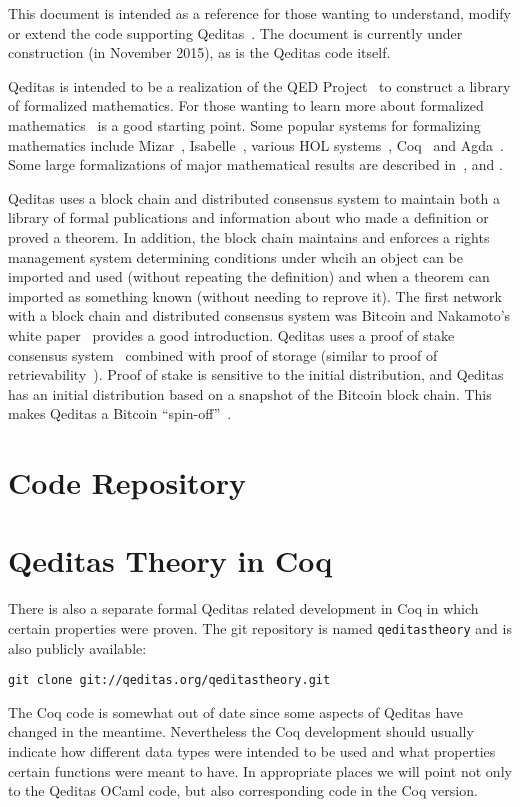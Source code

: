This document is intended as a reference
for those wanting to understand, modify or extend the
code supporting Qeditas~\cite{White2015c}.
The document is currently under construction (in November 2015),
as is the Qeditas code itself.

Qeditas is intended to be a realization of the QED Project~\cite{QED}
to construct a library of formalized mathematics.
For those wanting to learn more about formalized
mathematics~\cite{Barendregt2005} is a good starting point.
Some popular systems for formalizing mathematics include
Mizar~\cite{RudnickiTrybulec2001},
Isabelle~\cite{Nipkow-Paulson-Wenzel:2002},
various HOL systems~\cite{Gordon91,harrison-hollight},
Coq~\cite{Coq:manual} and
Agda~\cite{Norell08}.
Some large formalizations of major mathematical results
are described in~\cite{Gonthier2007}, \cite{Gonthier2013}
and
\cite{Flyspeck2015}.

Qeditas uses a block chain and distributed consensus system to maintain both a library
of formal publications
and information about who made a definition or proved a theorem.
In addition, the block chain maintains and enforces a rights management
system determining conditions under whcih an object can be imported and used
(without repeating the definition)
and when a theorem can imported as something known (without needing to reprove it).
The first network with a block chain and distributed consensus system
was Bitcoin and Nakamoto's white paper~\cite{Nakamoto2008} provides a good introduction.
Qeditas uses a proof of stake consensus system~\cite{ProofOfStakeDefinite}
combined with proof of storage (similar to proof of retrievability~\cite{MillerJSPK14}).
Proof of stake is sensitive to the initial distribution, and Qeditas
has an initial distribution based on a snapshot of the Bitcoin block chain.
This makes Qeditas a Bitcoin ``spin-off''~\cite{Spinoff,PreSpinoff}.

\section{Code Repository}



\section{Qeditas Theory in Coq}

There is also a separate formal Qeditas related development in Coq
in which certain properties were proven.
The git repository is named {\tt{qeditastheory}}
and is also publicly available:
\begin{verbatim}
git clone git://qeditas.org/qeditastheory.git
\end{verbatim}
The Coq code is somewhat out of date since some aspects of Qeditas have changed
in the meantime. Nevertheless the Coq development should usually indicate how
different data types were intended to be used and what properties certain functions
were meant to have. In appropriate places we will point not only to the Qeditas
OCaml code, but also corresponding code in the Coq version.


